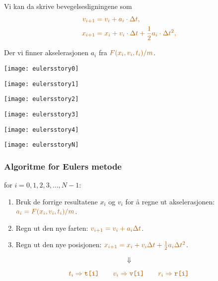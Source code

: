 \documentclass[english, 12pt]{beamer}
\newcommand{\alrt}{\color{AlertColor}}
\begin{document}
\begin{frame}
Vi kan da skrive bevegelsesligningene som
\begin{align*}
\alrt v_{i+1} &\alrt  = v_i + a_i\cdot \Delta t, \\
\alrt x_{i+1} &\alrt = x_i + v_i\cdot \Delta t + \frac{1}{2}a_i\cdot \Delta t^2, 
\end{align*}

Der vi finner akselerasjonen $a_i$ fra $\alrt F(x_i, v_i, t_i)/m$.
\end{frame}


\begin{frame}
\begin{center}
\texttt{[image: eulersstory0]}
\end{center}
\end{frame}

\begin{frame}
\begin{center}
\texttt{[image: eulersstory1]}
\end{center}
\end{frame}

\begin{frame}
\begin{center}
\texttt{[image: eulersstory2]}
\end{center}
\end{frame}

\begin{frame}
\begin{center}
\texttt{[image: eulersstory3]}
\end{center}
\end{frame}

\begin{frame}
\begin{center}
\texttt{[image: eulersstory4]}
\end{center}
\end{frame}

\begin{frame}
\begin{center}
\texttt{[image: eulersstoryN]}
\end{center}
\end{frame}


\begin{frame}[fragile]
\frametitle{Algoritme for Eulers metode}
for $i=0,1,2,3,\ldots, N-1$:
\begin{enumerate}
	\item Bruk de forrige resultatene $x_i$ og $v_i$ for å regne ut akselerasjonen: $\alrt a_i = F(x_i, v_i, t_i)/m$.
	\item Regn ut den nye farten: $\alrt v_{i+1} = v_i + a_i\Delta t$.
	\item Regn ut den nye posisjonen: $\alrt x_{i+1} = x_i + v_i\Delta t + \frac{1}{2}a_i\Delta t^2$.
\end{enumerate}
 {
$$\Downarrow$$


$$\alrt t_i \Rightarrow \texttt{t[i]} \qquad  v_i \Rightarrow \texttt{v[i]} \qquad  r_i  \Rightarrow \texttt{r[i]}$$
}

\end{frame}
\end{document}
